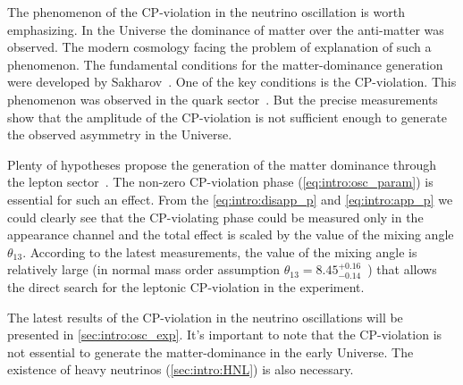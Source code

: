 \documentclass[../main.tex]{subfiles}
\begin{document}
The phenomenon of the CP-violation in the neutrino oscillation is worth emphasizing. In the Universe the dominance of matter over the anti-matter was observed. The modern cosmology facing the problem of explanation of such a phenomenon. The fundamental conditions for the matter-dominance generation were developed by Sakharov~\cite{sakharov1967violation}. One of the key conditions is the CP-violation. This phenomenon was observed in the quark sector~\cite{Tanabashi2018}. But the precise measurements show that the amplitude of the CP-violation is not sufficient enough to generate the observed asymmetry in the Universe.

Plenty of hypotheses propose the generation of the matter dominance through the lepton sector~\cite{Davidson2008}. The non-zero CP-violation phase (\autoref{eq:intro:osc_param}) is essential for such an effect. From the \autoref{eq:intro:disapp_p} and \autoref{eq:intro:app_p} we could clearly see that the CP-violating phase could be measured only in the appearance channel and the total effect is scaled by the value of the mixing angle $\theta_{13}$. According to the latest measurements, the value of the mixing angle is relatively large (in normal mass order assumption $\theta_{13}=8.45^{+0.16}_{-0.14}$~\cite{DeSalas2018}) that allows the direct search for the leptonic CP-violation in the experiment.

The latest results of the CP-violation in the neutrino oscillations will be presented in \autoref{sec:intro:osc_exp}. It's important to note that the CP-violation is not essential to generate the matter-dominance in the early Universe. The existence of heavy neutrinos (\autoref{sec:intro:HNL}) is also necessary.
\end{document}
